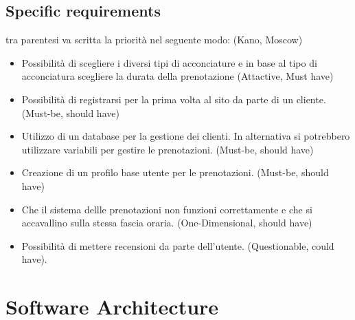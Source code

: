 \documentclass{article}
\begin{document}
\subsection {Specific requirements}
tra parentesi va scritta la priorità nel seguente modo: (Kano, Moscow)
\begin{itemize}
\item Possibilità di scegliere i diversi tipi di acconciature e in 
base al tipo di acconciatura scegliere la durata della prenotazione (Attactive, Must have)
\item Possibilità di registrarsi per la prima volta al sito da parte di un cliente. (Must-be, should have)
\item Utilizzo di un database per la gestione dei clienti. In alternativa si potrebbero utilizzare 
variabili per gestire le prenotazioni. (Must-be, should have)
\item Creazione di un profilo base utente per le prenotazioni. (Must-be, should have)
\item Che il sistema dellle prenotazioni non funzioni correttamente 
e che si accavallino sulla stessa fascia oraria. (One-Dimensional, should have)
\item Possibilità di mettere recensioni da parte dell'utente. (Questionable, could have).

\end{itemize}
\newpage 
\section{Software Architecture}
\end{document}

